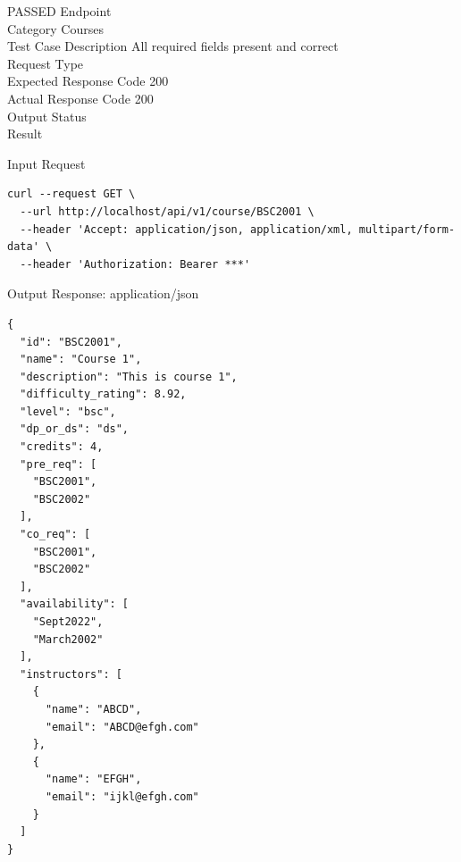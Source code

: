 \begin{testcase}{60}{PASSED}
Endpoint \hfill {}\\
Category \hfill Courses\\
Test Case Description \hfill All required fields present and correct\\

Request Type    \hfill {}\\
Expected Response Code    \hfill 200\\
Actual Response Code    \hfill 200\\

Output Status \hfill {}\\
Result \hfill {}

\begin{ipblock}{Input Request}
\begin{verbatim}
curl --request GET \
  --url http://localhost/api/v1/course/BSC2001 \
  --header 'Accept: application/json, application/xml, multipart/form-data' \
  --header 'Authorization: Bearer ***'
\end{verbatim}
\end{ipblock}

\begin{opblock}{Output Response: application/json}
\begin{verbatim}
{
  "id": "BSC2001",
  "name": "Course 1",
  "description": "This is course 1",
  "difficulty_rating": 8.92,
  "level": "bsc",
  "dp_or_ds": "ds",
  "credits": 4,
  "pre_req": [
    "BSC2001",
    "BSC2002"
  ],
  "co_req": [
    "BSC2001",
    "BSC2002"
  ],
  "availability": [
    "Sept2022",
    "March2002"
  ],
  "instructors": [
    {
      "name": "ABCD",
      "email": "ABCD@efgh.com"
    },
    {
      "name": "EFGH",
      "email": "ijkl@efgh.com"
    }
  ]
}
\end{verbatim}
\end{opblock}
\end{testcase}

